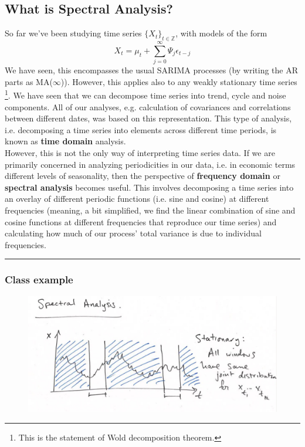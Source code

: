 \subsection{What is Spectral Analysis?}
So far we've been studying time series $\{X_t\}_{t\in \mathbb{Z}}$, with models of the form \[X_t=\mu_t +\sum_{j=0}^\infty \Psi_j \epsilon_{t-j} \]
We have seen, this encompasses the usual SARIMA processes (by writing the AR parts as MA($\infty$)). However, this applies also to any weakly stationary time series \footnote{This is the statement of Wold decomposition theorem.}. We have seen that we can decompose time series into trend, cycle and noise components. All of our analyses, e.g. calculation of covariances and correlations between different dates, was based on this representation. This type of analysis, i.e. decomposing a time series into elements across different time periods, is known as \textbf{time domain} analysis.\\

However, this is not the only way of interpreting time series data. If we are primarily concerned in analyzing periodicities in our data, i.e. in economic terms different levels of seasonality, then the perspective of \textbf{frequency domain} or \textbf{spectral analysis} becomes useful. This involves decomposing a time series into an overlay of different periodic functions (i.e. sine and cosine) at different frequencies (meaning, a bit simplified, we find the linear combination of sine and cosine functions at different frequencies that reproduce our time series) and calculating how much of our process' total variance is due to individual frequencies.\\

\noindent
\rule{\linewidth}{0.4pt}

\subsubsection{Class example}

\begin{figure}[h]
\includegraphics[scale=0.3]{images/Screenshot 2024-04-29 at 08.36.41.jpg}
\centering
\end{figure}


